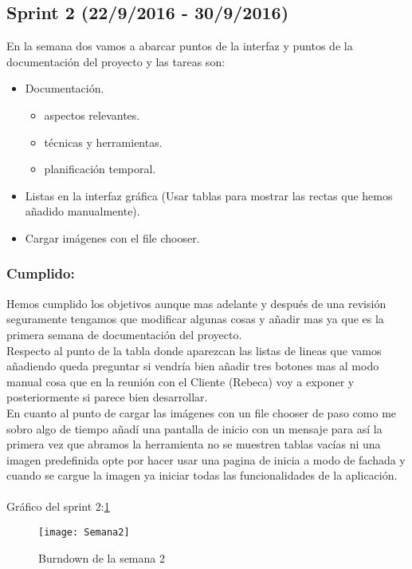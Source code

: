 \subsection{Sprint 2 (22/9/2016 - 30/9/2016)}
En la semana dos vamos a abarcar puntos de la interfaz y puntos de la documentación del proyecto y las tareas son:
 
\begin{itemize}
\item Documentación. 
\begin{itemize}
	\item aspectos relevantes. 
	\item técnicas y herramientas.
	\item planificación temporal.
	\end{itemize}
\item Listas en la interfaz gráfica (Usar tablas para mostrar las rectas que hemos añadido manualmente).
\item Cargar imágenes con el file chooser.
\end{itemize}

\subsubsection{Cumplido:}
Hemos cumplido los objetivos aunque mas adelante y después de una revisión seguramente tengamos que modificar algunas cosas y añadir mas ya que es la primera semana de documentación del proyecto.\\
Respecto al punto de la tabla donde aparezcan las listas de lineas que vamos añadiendo queda preguntar si vendría bien añadir tres botones mas al modo manual cosa que en la reunión con el Cliente (Rebeca) voy a exponer y posteriormente si parece bien desarrollar.\\
En cuanto al punto de cargar las imágenes con un file chooser de paso como me sobro algo de tiempo añadí una pantalla de inicio con un mensaje para así la primera vez que abramos la herramienta no se muestren tablas vacías ni una imagen predefinida opte por hacer usar una pagina de inicia a modo de fachada y cuando se cargue la imagen ya iniciar todas las funcionalidades de la aplicación.\\\\
Gráfico del sprint 2:\ref{fig:A.2.2}
\begin{figure}[h]
\centering
\texttt{[image: Semana2]}
\caption{Burndown de la semana 2}
\label{fig:A.2.2}
\end{figure}

